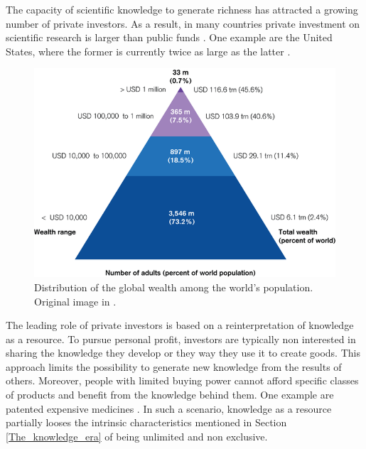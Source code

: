 The capacity of scientific knowledge to generate richness has attracted a growing number of private investors. As a result, in many countries private investment on scientific research is larger than public funds \cite{UNESCO}. One example are the United States, where the former is currently twice as large as the latter \cite{Boroush}. 

\begin{figure}[!t] 
 \begin{center}
 \includegraphics[scale=0.4]{Images/Global_wealth_pyramid.png}
 \caption{Distribution of the global wealth among the world's population. Original image in \cite{Kersley}.}
 \label{Global_wealth_pyramid}
 \end{center}
\end{figure}

The leading role of private investors is based on a reinterpretation of knowledge as a resource. To pursue personal profit, investors are typically non interested in sharing the knowledge they develop or they way they use it to create goods. This approach limits the possibility to generate new knowledge from the results of others. Moreover, people with limited buying power cannot afford specific classes of products and benefit from the knowledge behind them. One example are patented expensive medicines \cite{Heller}. In such a scenario, knowledge as a resource partially looses the intrinsic characteristics mentioned in Section \ref{The_knowledge_era} of being unlimited and non exclusive. 

